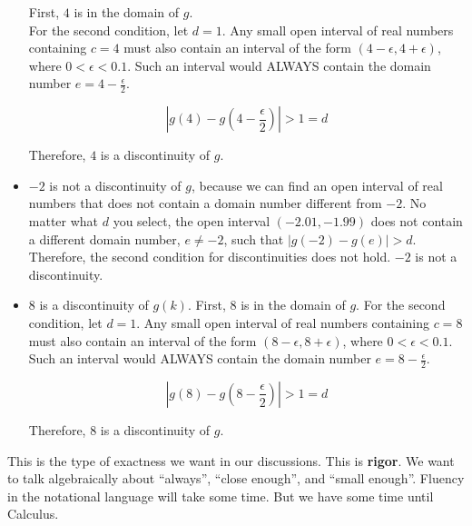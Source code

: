 \documentclass{ximera}
\begin{document}
\begin{example}
\begin{itemize}
First, $4$ is in the domain of $g$. \\


For the second condition, let $d = 1$. Any small open interval of real numbers containing $c = 4$ must also contain an interval of the form $(4-\epsilon, 4+\epsilon)$, where $0 < \epsilon < 0.1$.  Such an interval would ALWAYS contain the domain number $e = 4-\frac{\epsilon}{2}$.

\[ \left| g(4) - g\left(4-\frac{\epsilon}{2}\right) \right| >  1 = d \]

Therefore, $4$ is a discontinuity of $g$. \\


\item $-2$ is not a discontinuity of $g$, because we can find an open interval of real numbers that does not contain a domain number different from $-2$.  No matter what $d$ you select, the open interval $(-2.01, -1.99)$ does not contain a different domain number, $e \ne -2$, such that $|g(-2) - g(e)| > d$.  Therefore, the second condition for discontinuities does not hold.  $-2$ is not a discontinuity. \\




\item $8$ is a discontinuity of $g(k)$.  First, $8$ is in the domain of $g$. For the second condition, let $d = 1$. Any small open interval of real numbers containing $c = 8$ must also contain an interval of the form $(8-\epsilon, 8+\epsilon)$, where $0 < \epsilon < 0.1$.   Such an interval would ALWAYS contain the domain number $e = 8-\frac{\epsilon}{2}$.

\[ \left| g(8) - g\left(8-\frac{\epsilon}{2}\right) \right| > 1 = d \]

Therefore, $8$ is a discontinuity of $g$.

\end{itemize}



\end{example}

This is the type of exactness we want in our discussions.  This is \textbf{\textcolor{purple!85!blue}{rigor}}. We want to talk algebraically about ``always'', ``close enough'', and ``small enough''.  Fluency in the notational language will take some time.  But we have some time until Calculus.
\end{document}
